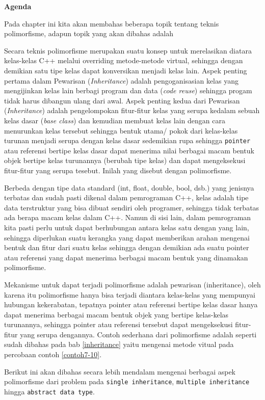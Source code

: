 \textbf{Agenda}

Pada chapter ini kita akan membahas beberapa topik tentang 
teknis polimorfisme, adapun topik yang akan dibahas
adalah

\minitoc

Secara teknis polimorfisme merupakan suatu konsep untuk merelasikan
diatara kelas-kelas C++ melalui overriding metode-metode virtual,
sehingga dengan demikian satu tipe kelas dapat konversikan menjadi kelas
lain. Aspek penting pertama dalam Pewarisan (\emph{Inheritance}) adalah
pengoganisasian kelas yang mengijinkan kelas lain berbagi program dan
data (\emph{code reuse}) sehingga progam tidak harus dibangun ulang dari
awal. Aspek penting kedua dari Pewarisan (\emph{Inheritance}) adalah
pengelompokan fitur-fitur kelas yang serupa kedalam sebuah kelas dasar
(\emph{base class}) dan kemudian membuat kelas lain dengan cara
menurunkan kelas tersebut sehingga bentuk utama/ pokok dari kelas-kelas
turunan menjadi serupa dengan kelas dasar sedemikian rupa sehingga
\texttt{pointer} atau referensi bertipe kelas dasar dapat menerima nilai
berbagai macam bentuk objek bertipe kelas turunannya (berubah tipe
kelas) dan dapat mengeksekusi fitur-fitur yang serupa tesebut. Inilah
yang disebut dengan polimorfisme.

Berbeda dengan tipe data standard (int, float, double, bool, dsb.) yang
jenisnya terbatas dan sudah pasti dikenal dalam pemrograman C++, kelas
adalah tipe data terstruktur yang bisa dibuat sendiri oleh programer,
sehingga tidak terbatas ada berapa macam kelas dalam C++. Namun di sisi
lain, dalam pemrograman kita pasti perlu untuk dapat berhubungan antara
kelas satu dengan yang lain, sehingga diperlukan suatu kerangka yang
dapat memberikan arahan mengenai bentuk dan fitur dari suatu kelas
sehingga dengan demikian ada suatu pointer atau referensi yang dapat
menerima berbagai macam bentuk yang dinamakan polimorfisme.

Mekanisme untuk dapat terjadi polimorfisme adalah pewarisan
(inheritance), oleh karena itu polimorfisme hanya bisa terjadi diantara
kelas-kelas yang mempunyai hubungan kekerabatan, tepatnya pointer atau
referensi bertipe kelas dasar hanya dapat menerima berbagai macam bentuk
objek yang bertipe kelas-kelas turunannya, sehingga pointer atau
referensi tersebut dapat mengeksekusi fitur-fitur yang serupa dengannya.
Contoh sederhana dari polimorfisme adalah seperti sudah dibahas pada bab
\ref{inheritance} yaitu mengenai metode vitual pada percobaan contoh \ref{contoh7-10}.

Berikut ini akan dibahas secara lebih mendalam mengenai berbagai aspek
polimorfisme dari problem pada \texttt{single\ inheritance},
\texttt{multiple\ inheritance} hingga \texttt{abstract\ data\ type}.

